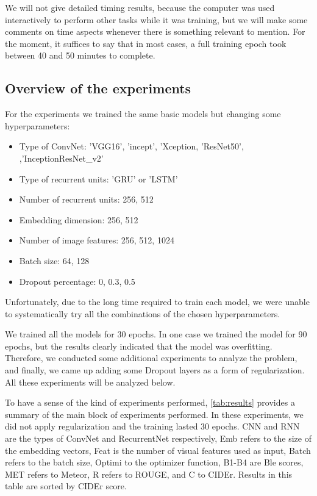 We will not give detailed timing results, because the computer was used interactively to perform other tasks while it was training, but we will make some comments on time aspects whenever there is something relevant to mention. For the moment, it suffices to say that in most cases, a full training epoch took between 40 and 50 minutes to complete.

\subsection{Overview of the experiments}

For the experiments we trained the same basic models but changing some hyperparameters:

\begin{itemize}
    \item Type of ConvNet: 'VGG16', 'incept', 'Xception, 'ResNet50', ,'InceptionResNet\_v2'
    \item Type of recurrent units: 'GRU' or 'LSTM'
    \item Number of recurrent units: 256, 512
    \item Embedding dimension: 256, 512
    \item Number of image features: 256, 512, 1024
    \item Batch size: 64, 128
    \item Dropout percentage: 0, 0.3, 0.5
\end{itemize}

Unfortunately, due to the long time required to train each model, we were unable to systematically try all the combinations of the chosen hyperparameters. 

We trained all the models for 30 epochs. In one case we trained the model for 90 epochs, but the results clearly indicated that the model was overfitting.  Therefore, we conducted some additional experiments to analyze the problem, and finally, we came up adding some Dropout layers as a form of regularization.  All these experiments will be analyzed below.

To have a sense of the kind of experiments performed, \cref{tab:results} provides a summary of the main block of experiments performed. In these experiments, we did not apply regularization and the training lasted 30 epochs. CNN and RNN are the types of ConvNet and RecurrentNet respectively, Emb refers to the size of the embedding vectors, Feat is the number of visual features used as input, Batch refers to the batch size, Optimi to the optimizer function, B1-B4 are Ble scores, MET refers to Meteor, R refers to ROUGE, and C to CIDEr. Results in this table are sorted by CIDEr score.

